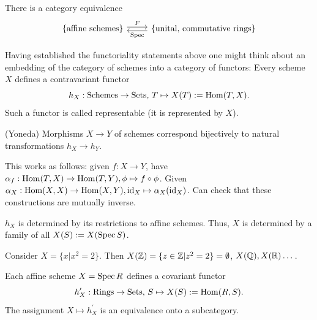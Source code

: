\documentclass[a4paper,11pt]{article}
\begin{document}
				\begin{cor}
					There is a category equivalence
					\begin{equation*}
						\begin{tikzcd}
							\{\text{affine schemes}\}\ar[r,shift left=.5ex,"F"] & \ar[l,shift left=.5ex,"\spec"]\{\text{unital, commutative rings}\}
						\end{tikzcd}
					\end{equation*}
				\end{cor}

				Having established the functoriality statements above one might think about an embedding of the category of schemes into a category of functors: Every scheme $X$ defines a contravariant functor
				\begin{equation*}
					h_X:\mathrm{Schemes}\rightarrow\mathrm{Sets},\, T\mapsto X(T):=\operatorname{Hom}(T,X).
				\end{equation*}
				Such a functor is called representable (it is represented by $X$).

				\begin{lemma}
					(Yoneda) Morphisms $X\rightarrow Y$ of schemes correspond bijectively to natural transformations $h_X\rightarrow h_Y$.
				\end{lemma}

				This works as follows: given $f:X\rightarrow Y$, have $\alpha_f:\operatorname{Hom}(T,X)\rightarrow\operatorname{Hom}(T,Y),\phi\mapsto f\circ\phi$. Given $\alpha_X:\operatorname{Hom}(X,X)\rightarrow\operatorname{Hom}(X,Y),\operatorname{id}_X\mapsto\alpha_X(\operatorname{id}_X)$. Can check that these constructions are mutually inverse.
				
				\begin{remark}
					$h_X$ is determined by its restrictions to affine schemes. Thus, $X$ is determined by a family of all $X(S):=X(\operatorname{Spec} S)$.
				\end{remark}

				\begin{eg}
					Consider $X=\{x|x^2=2\}$. Then $X(\mathbb{Z})=\{z\in\mathbb{Z}|z^2=2\}=\emptyset$, $X(\mathbb{Q}),X(\mathbb{R})\dots$.
				\end{eg}

				\begin{cor}
					Each affine scheme $X=\operatorname{Spec} R$ defines a covariant functor
					\begin{equation*}
						h^\prime_X:\mathrm{Rings}\rightarrow\mathrm{Sets},\, S\mapsto X(S):=\operatorname{Hom}(R,S).
					\end{equation*}
					The assignment $X\mapsto h^\prime_X$ is an equivalence onto a subcategory.
				\end{cor}
\end{document}
